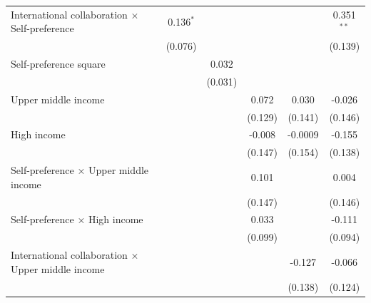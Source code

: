 \begin{table}[H]
\begin{tabular}{lccccc}
      International collaboration × Self-preference                       & 0.136$^{*}$   &               &               &               & 0.351$^{**}$\\   
                                                                          & (0.076)       &               &               &               & (0.139)\\   
      Self-preference square                                              &               & 0.032         &               &               &   \\   
                                                                          &               & (0.031)       &               &               &   \\   
      Upper middle income                                                 &               &               & 0.072         & 0.030         & -0.026\\   
                                                                          &               &               & (0.129)       & (0.141)       & (0.146)\\   
      High income                                                         &               &               & -0.008        & -0.0009       & -0.155\\   
                                                                          &               &               & (0.147)       & (0.154)       & (0.138)\\   
      Self-preference × Upper middle income                               &               &               & 0.101         &               & 0.004\\   
                                                                          &               &               & (0.147)       &               & (0.146)\\   
      Self-preference × High income                                       &               &               & 0.033         &               & -0.111\\   
                                                                          &               &               & (0.099)       &               & (0.094)\\   
      International collaboration × Upper middle income                   &               &               &               & -0.127        & -0.066\\   
                                                                          &               &               &               & (0.138)       & (0.124)\\   

\end{tabular}
\end{table}
